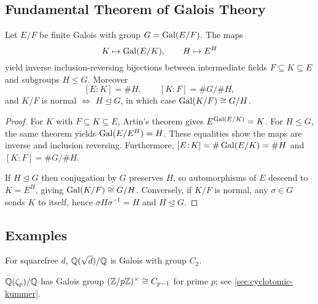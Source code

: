 \subsection{Fundamental Theorem of Galois Theory}
\begin{theorem}\label{thm:FTGT}
Let $E/F$ be finite Galois with group $G=\operatorname{Gal}(E/F)$. The maps
\[
K\mapsto \operatorname{Gal}(E/K),\qquad H\mapsto E^H
\]
yield inverse inclusion-reversing bijections between intermediate fields $F\subseteq K\subseteq E$ and subgroups $H\le G$. Moreover
\[
[E\!:\!K]=\#H,\qquad [K\!:\!F]=\#G/\#H,
\]
and $K/F$ is normal $\iff$ $H\trianglelefteq G$, in which case $\operatorname{Gal}(K/F)\cong G/H$.
\end{theorem}
\begin{proof}
For $K$ with $F\subseteq K\subseteq E$, Artin's theorem gives $E^{\operatorname{Gal}(E/K)}=K$.
For $H\le G$, the same theorem yields $\operatorname{Gal}(E/E^H)=H$. These equalities show the
maps are inverse and inclusion reversing. Furthermore,
$[E\!:\!K]=\#\operatorname{Gal}(E/K)=\#H$ and $[K\!:\!F]=\#G/\#H$.

If $H\trianglelefteq G$ then conjugation by $G$ preserves $H$, so automorphisms
of $E$ descend to $K=E^H$, giving $\operatorname{Gal}(K/F)\cong G/H$. Conversely, if $K/F$ is
normal, any $\sigma\in G$ sends $K$ to itself, hence $\sigma H\sigma^{-1}=H$ and
$H\trianglelefteq G$.
\end{proof}

\subsection{Examples}
\begin{example}[Quadratic]
For squarefree $d$, $\mathbb{Q}(\sqrt d)/\mathbb{Q}$ is Galois with group $C_2$.
\end{example}
\begin{example}
$\mathbb{Q}(\zeta_p)/\mathbb{Q}$ has Galois group $(\mathbb{Z}/p\mathbb{Z})^\times\cong C_{p-1}$ for prime $p$; see \cref{sec:cyclotomic-kummer}.
\end{example}
